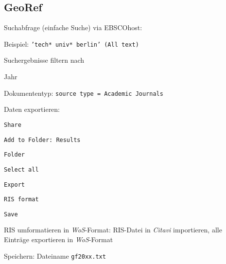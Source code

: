 \subsection*{GeoRef}
\begin{compactitem}
\item Suchabfrage (einfache Suche) via EBSCOhost:
	\begin{compactitem}
	\item Beispiel: \texttt{'tech* univ* berlin' (All text)}
	\end{compactitem}
\item Suchergebnisse filtern nach
	\begin{compactitem}
    \item Jahr
    \item Dokumententyp: \texttt{source type = Academic Journals}
    \end{compactitem}
\item Daten exportieren: 
	\begin{compactitem}
	\item \texttt{Share}
    \item \texttt{Add to Folder: Results}
    \item \texttt{Folder}
    \item \texttt{Select all}
    \item \texttt{Export}
    \item \texttt{RIS format}
    \item \texttt{Save}
	\end{compactitem}
\item RIS umformatieren in \textit{WoS}-Format: RIS-Datei in \textit{Citavi} importieren, alle Einträge exportieren in \textit{WoS}-Format
\item Speichern: Dateiname \texttt{gf20xx.txt}
\end{compactitem}

